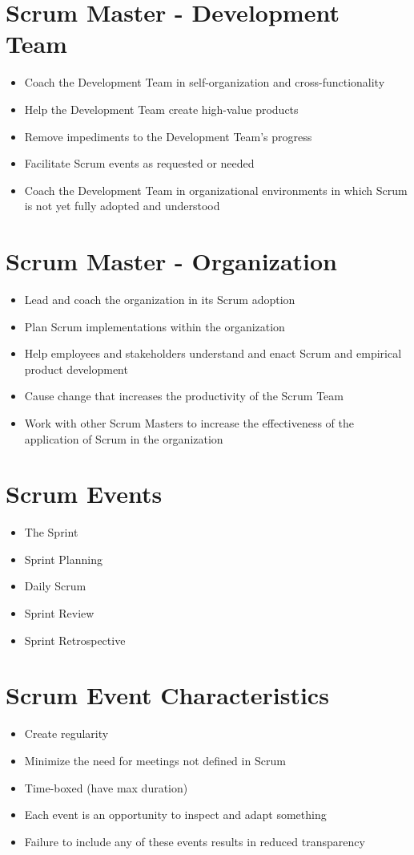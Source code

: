 \documentclass[a4paper,11pt,twocolumn]{article}
\begin{document}
\section*{Scrum Master - Development Team}
\begin{itemize}
    \item Coach the Development Team in self-organization and cross-functionality
    \item Help the Development Team create high-value products
    \item Remove impediments to the Development Team's progress
    \item Facilitate Scrum events as requested or needed
    \item Coach the Development Team in organizational environments in which Scrum is not yet fully adopted and understood
\end{itemize}

\section*{Scrum Master - Organization}
\begin{itemize}
    \item Lead and coach the organization in its Scrum adoption
    \item Plan Scrum implementations within the organization
    \item Help employees and stakeholders understand and enact Scrum and empirical product development
    \item Cause change that increases the productivity of the Scrum Team
    \item Work with other Scrum Masters to increase the effectiveness of the application of Scrum in the organization
\end{itemize}

\section*{Scrum Events}
\begin{itemize}
    \item The Sprint
	\item Sprint Planning
	\item Daily Scrum
	\item Sprint Review
	\item Sprint Retrospective
\end{itemize}

\section*{Scrum Event Characteristics}
\begin{itemize}
    \item Create regularity
	\item Minimize the need for meetings not defined in Scrum
	\item Time-boxed (have max duration)
	\item Each event is an opportunity to inspect and adapt something
	\item Failure to include any of these events results in reduced transparency
\end{itemize}
\end{document}
